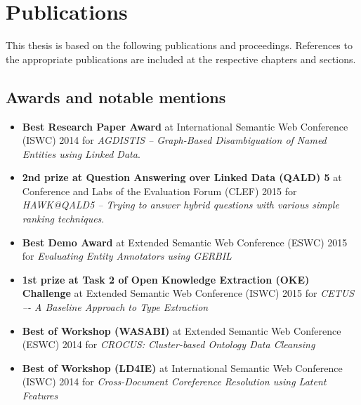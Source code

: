 \chapter*{Publications}

This thesis is based on the following publications and proceedings.
References to the appropriate publications are included at the respective chapters and sections.

\bigskip

\section*{Awards and notable mentions}
\begin{itemize}
    \item \textbf{Best Research Paper Award} at International Semantic Web Conference (ISWC) 2014 for \textit{AGDISTIS -- Graph-Based Disambiguation of Named Entities using Linked Data}.
    \item \textbf{2nd prize at Question Answering over Linked Data (QALD) 5} at Conference and Labs of the Evaluation Forum (CLEF) 2015 for \textit{HAWK@QALD5 -- Trying to answer hybrid questions with various simple ranking techniques}.
    \item \textbf{Best Demo Award} at Extended Semantic Web Conference (ESWC) 2015 for \textit{Evaluating Entity Annotators using GERBIL}
    \item \textbf{1st prize at Task 2 of Open Knowledge Extraction (OKE) Challenge} at Extended Semantic Web Conference (ISWC) 2015 for \textit{CETUS –- A Baseline Approach to Type Extraction}
    \item \textbf{Best of Workshop (WASABI)} at Extended Semantic Web Conference (ESWC) 2014 for \textit{CROCUS: Cluster-based Ontology Data Cleansing}
    \item \textbf{Best of Workshop (LD4IE)} at International Semantic Web Conference (ISWC) 2014 for \textit{Cross-Document Coreference Resolution using Latent Features} 
\end{itemize}

